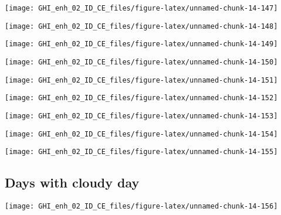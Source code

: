 \documentclass[
  10pt,
  a4paper,oneside]{article}
\begin{document}
\begin{center}\texttt{[image: GHI\_enh\_02\_ID\_CE\_files/figure-latex/unnamed-chunk-14-147]} \end{center}

\begin{center}\texttt{[image: GHI\_enh\_02\_ID\_CE\_files/figure-latex/unnamed-chunk-14-148]} \end{center}

\begin{center}\texttt{[image: GHI\_enh\_02\_ID\_CE\_files/figure-latex/unnamed-chunk-14-149]} \end{center}

\begin{center}\texttt{[image: GHI\_enh\_02\_ID\_CE\_files/figure-latex/unnamed-chunk-14-150]} \end{center}

\begin{center}\texttt{[image: GHI\_enh\_02\_ID\_CE\_files/figure-latex/unnamed-chunk-14-151]} \end{center}

\begin{center}\texttt{[image: GHI\_enh\_02\_ID\_CE\_files/figure-latex/unnamed-chunk-14-152]} \end{center}

\begin{center}\texttt{[image: GHI\_enh\_02\_ID\_CE\_files/figure-latex/unnamed-chunk-14-153]} \end{center}

\begin{center}\texttt{[image: GHI\_enh\_02\_ID\_CE\_files/figure-latex/unnamed-chunk-14-154]} \end{center}

\begin{center}\texttt{[image: GHI\_enh\_02\_ID\_CE\_files/figure-latex/unnamed-chunk-14-155]} \end{center}

\FloatBarrier

\hypertarget{days-with-cloudy-day}{%
\subsection{Days with cloudy day}\label{days-with-cloudy-day}}

\begin{center}\texttt{[image: GHI\_enh\_02\_ID\_CE\_files/figure-latex/unnamed-chunk-14-156]} \end{center}
\end{document}
